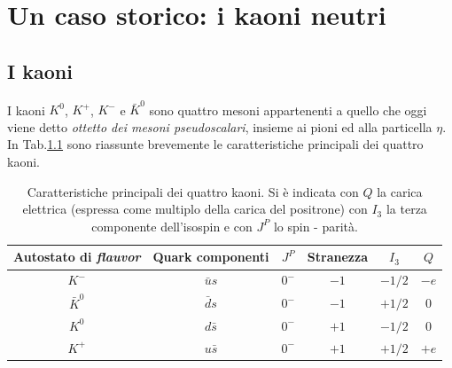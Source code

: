 
\chapter{Un caso storico: i kaoni neutri}
\section{I kaoni}
\noindent
I kaoni $K^0$, $K^+$, $K^-$ e $\bar{K}^0$ sono quattro mesoni appartenenti a quello che oggi viene detto \emph{ottetto dei mesoni pseudoscalari}, insieme ai pioni
ed alla particella $\eta$. 
In Tab.\ref{quattrokaoni} sono riassunte brevemente le caratteristiche principali dei quattro kaoni.
\begin{table}
\begin{center}
\begin{tabular}{|c|c|c|c|c|c|}\hline
Autostato di \emph{flauvor} & Quark componenti & $J^P$ & Stranezza & $I_3$ & $Q$\\\hline
$K^-$ & $\bar{u}s$ & $0^-$ & $-1$ & $-1/2$ & $-e$\\\hline
$\bar{K}^0$ & $\bar{d}s$ & $0^-$ & $-1$ & $+1/2$ & $0$\\\hline
$K^0$ & $d\bar{s}$ & $0^-$ & $+1$ & $-1/2$ & $0$\\\hline
$K^+$ & $u\bar{s}$ & $0^-$ & $+1$ & $+1/2$ & $+e$\\\hline
\end{tabular}
\end{center}
\caption{Caratteristiche principali dei quattro kaoni. Si è indicata con $Q$ la carica elettrica (espressa come multiplo della carica del
positrone) con $I_3$ la terza componente dell'isospin e con $J^P$ lo spin - parità.}
\label{quattrokaoni}
\end{table}

